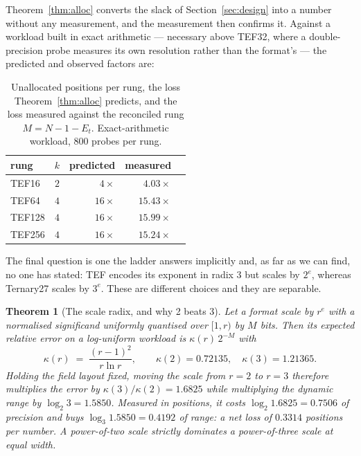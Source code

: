 \documentclass[11pt]{article}
\newtheorem{theorem}{Theorem}
\theoremstyle{definition}
\begin{document}
Theorem~\ref{thm:alloc} converts the slack of Section~\ref{sec:design} into a
number without any measurement, and the measurement then confirms it. Against a
workload built in exact arithmetic --- necessary above TEF32, where a
double-precision probe measures its own resolution rather than the format's ---
the predicted and observed factors are:

\begin{table}[t]\centering
\caption{Unallocated positions per rung, the loss Theorem~\ref{thm:alloc}
predicts, and the loss measured against the reconciled rung
$M = N - 1 - E_t$. Exact-arithmetic workload, 800 probes per rung.}
\label{tab:alloc}
\begin{tabular}{lrrrr}
\toprule
rung & $k$ & predicted & measured \\
\midrule
TEF16  & $2$ & $4\times$  & $4.03\times$  \\
TEF64  & $4$ & $16\times$ & $15.43\times$ \\
TEF128 & $4$ & $16\times$ & $15.99\times$ \\
TEF256 & $4$ & $16\times$ & $15.24\times$ \\
\bottomrule
\end{tabular}
\end{table}

The final question is one the ladder answers implicitly and, as far as we can
find, no one has stated: TEF encodes its exponent in radix 3 but scales by
$2^{e}$, whereas Ternary27 scales by $3^{e}$. These are different choices and
they are separable.

\begin{theorem}[The scale radix, and why 2 beats 3]
\label{thm:scaleradix}
Let a format scale by $r^{e}$ with a normalised significand uniformly quantised
over $[1, r)$ by $M$ bits. Then its expected relative error on a log-uniform
workload is $\kappa(r)\,2^{-M}$ with
\[
\kappa(r) \;=\; \frac{(r-1)^{2}}{r\ln r},
\qquad \kappa(2) = 0.72135,\quad \kappa(3) = 1.21365 .
\]
Holding the field layout fixed, moving the scale from $r=2$ to $r=3$ therefore
multiplies the error by $\kappa(3)/\kappa(2) = 1.6825$ while multiplying the
dynamic range by $\log_2 3 = 1.5850$. Measured in positions, it costs
$\log_2 1.6825 = 0.7506$ of precision and buys $\log_3 1.5850 = 0.4192$ of range:
a net loss of $0.3314$ positions per number. A power-of-two scale strictly
dominates a power-of-three scale at equal width.
\end{theorem}
\end{document}
